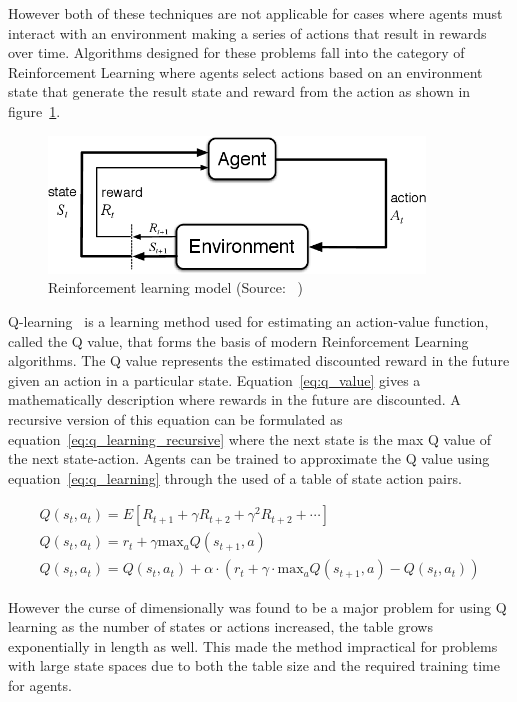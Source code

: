 However both of these techniques are not applicable for cases where agents must interact with an environment making a
series of actions that result in rewards over time. Algorithms designed for these problems fall into the category of
Reinforcement Learning where agents select actions based on an environment state that generate the result state and
reward from the action as shown in figure~\ref{fig:reinforcement_learning}.

\begin{figure}[h]
    \centering
    \includegraphics[width=10cm]{figures/2_background_lit_figs/agent_env_interaction.png}
    \caption{Reinforcement learning model (Source: ~\cite{Sutton1998})}
    \label{fig:reinforcement_learning}
\end{figure}

Q-learning~\citep{watkins1992q-learning} is a learning method used for estimating an action-value function,
called the Q value, that forms the basis of modern Reinforcement Learning algorithms. The Q value represents the
estimated discounted reward in the future given an action in a particular state. Equation~\eqref{eq:q_value} gives a
mathematically description where rewards in the future are discounted. A recursive version of this equation can be
formulated as equation~\eqref{eq:q_learning_recursive} where the next state is the max Q value of the next state-action.
Agents can be trained to approximate the Q value using equation~\eqref{eq:q_learning} through the used of a table
of state action pairs.

\begin{align}
    Q(s_t, a_t) = E[R_{t+1} + \gamma R_{t+2} + \gamma^2 R_{t+2} + \cdots ] \label{eq:q_value} \\
    Q(s_t, a_t) = r_t + \gamma \text{max}_a Q(s_{t+1} , a) \label{eq:q_learning_recursive} \\
    Q(s_t, a_t) = Q(s_t, a_t) + \alpha \cdot (r_t + \gamma \cdot \text{max}_a Q(s_{t+1} , a) - Q(s_t, a_t) ) \label{eq:q_learning}
\end{align}

However the curse of dimensionally was found to be a major problem for using Q learning as the number of states
or actions increased, the table grows exponentially in length as well. This made the method impractical for problems
with large state spaces due to both the table size and the required training time for agents.

